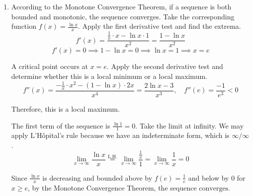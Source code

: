 \documentclass[a4paper, 12pt]{article}
\renewcommand{\headrulewidth}{0pt}
\renewcommand{\headrulewidth}{0pt}
\begin{document}
\begin{enumerate}[leftmargin=*,label=\textbf{\arabic*.}]
The integral diverges to negative infinity.

\item According to the Monotone Convergence Theorem, if a sequence is both bounded and monotonic, the sequence converges. Take the corresponding function $f(x)=\frac{\ln x}x$. Apply the first derivative test and find the extrema.
\[f'(x)=\frac{\frac1x\cdot x-\ln x\cdot1}{x^2}=\frac{1-\ln x}{x^2}\]
\[f'(x)=0\implies 1-\ln x=0\implies \ln x=1\implies x= e\]

A critical point occurs at $x= e$. Apply the second derivative test and determine whether this is a local minimum or a local maximum.
\[f''(x)=\frac{-\frac1x\cdot x^2-(1-\ln x)\cdot 2x}{x^4}=\frac{2\ln x-3}{x^3},\quad f''( e)=\frac{-1}{ e^3}<0\]

Therefore, this is a local maximum.

The first term of the sequence is $\frac{\ln 1}1=0$. Take the limit at infinity. We may apply L'Hôpital's rule because we have an indeterminate form, which is $\infty/\infty$.
\[\lim_{x\to\infty}\frac{\ln x}{x}\overset{\text{L.H.}}{=}\lim_{x\to\infty}\frac{\frac1x}1=\lim_{x\to\infty}\frac1x=0\]

Since $\frac{\ln x}x$ is decreasing and bounded above by $f( e)=\frac1{ e}$ and below by $0$ for $x\geq e$, by the Monotone Convergence Theorem, the sequence $\boxed{\text{converges}}$.
\end{enumerate}

\newpage
{}
{}

\newpage
\pagestyle{fancy}
\renewcommand{\headrulewidth}{1pt}

\end{document}
